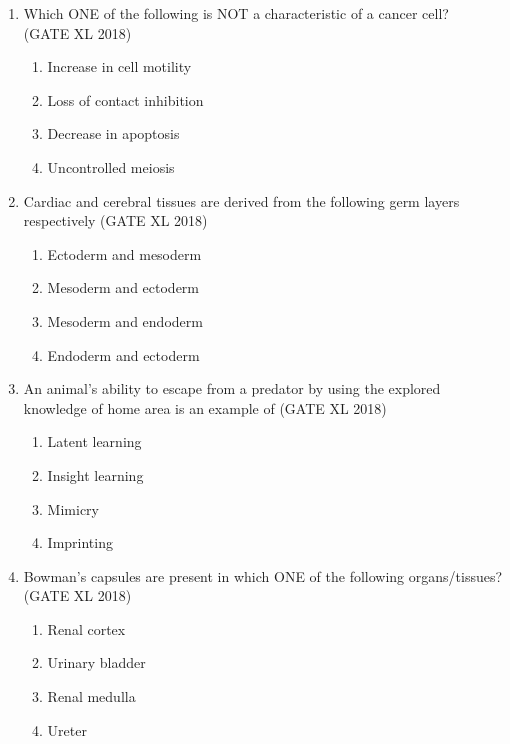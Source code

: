 \documentclass[14pt]{extarticle}
\begin{document}
\begin{flushleft}
\begin{enumerate}
    \item Which ONE of the following is NOT a characteristic of a cancer cell?\\
    \hfill(GATE XL 2018)\\
    \begin{multicols}{2}
    \begin{enumerate}[label=(\Alph*)]
        \item Increase in cell motility
        \item Loss of contact inhibition
        \item Decrease in apoptosis
        \item Uncontrolled meiosis
    \end{enumerate}
    \end{multicols}

    \item Cardiac and cerebral tissues are derived from the following germ layers respectively \hfill(GATE XL 2018)\\
    \begin{multicols}{2}
    \begin{enumerate}[label=(\Alph*)]
        \item Ectoderm and mesoderm
        \item Mesoderm and ectoderm
        \item Mesoderm and endoderm
        \item Endoderm and ectoderm
    \end{enumerate}
    \end{multicols}

    \item An animal’s ability to escape from a predator by using the explored knowledge of home area is an example of \hfill(GATE XL 2018)\\
    \begin{multicols}{2}
    \begin{enumerate}[label=(\Alph*)]
        \item Latent learning
        \item Insight learning
        \item Mimicry
        \item Imprinting
    \end{enumerate}
    \end{multicols}

    \item Bowman's capsules are present in which ONE of the following organs/tissues? \hfill(GATE XL 2018)\\
    \begin{multicols}{2}
    \begin{enumerate}[label=(\Alph*)]
        \item Renal cortex
        \item Urinary bladder
        \item Renal medulla
        \item Ureter
    \end{enumerate}
    \end{multicols}


\end{enumerate}
\end{flushleft}
\end{document}
